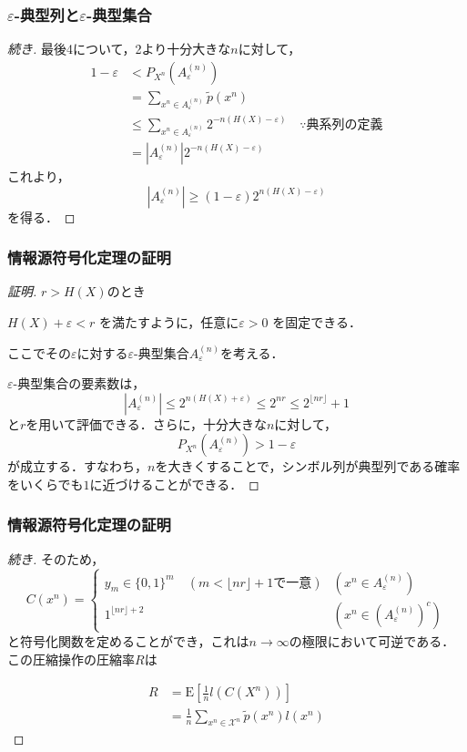 \documentclass{classes/myslide}
\begin{document}
\begin{frame}\frametitle{$\varepsilon$-典型列と$\varepsilon$-典型集合}
  \begin{proof}[続き]
    最後4について，2より十分大きな$n$に対して，
    \begin{align*}
      1 - \varepsilon 
      &< P_{X^n}(A_{\varepsilon}^{(n)}) \\
      &= \sum_{x^n \in A_{\varepsilon}^{(n)}} \tilde{p}(x^n) \\
      &\leq \sum_{x^n \in A_{\varepsilon}^{(n)}} 2^{-n(H(X) - \varepsilon)} \quad \because \text{典系列の定義} \\
      &= |A_{\varepsilon}^{(n)}| 2^{-n(H(X) - \varepsilon)}
    \end{align*}
    これより，
    \[
      |A_{\varepsilon}^{(n)}| \geq (1 - \varepsilon)2^{n(H(X) - \varepsilon)}
    \]
    を得る．
  \end{proof}
\end{frame}


\begin{frame}\frametitle{情報源符号化定理の証明}
  \begin{proof}[証明]
    $r > H(X)$のとき

    $H(X) + \varepsilon < r$ を満たすように，任意に$\varepsilon > 0$ を固定できる．

    ここでその$\varepsilon$に対する$\varepsilon$-典型集合$A_{\varepsilon}^{(n)}$を考える．

    $\varepsilon$-典型集合の要素数は，
    \[ |A_{\varepsilon}^{(n)}| \leq 2^{n(H(X) + \varepsilon)}  \leq 2^{nr} \leq 2^{\lfloor nr \rfloor} + 1\]
    と$r$を用いて評価できる．さらに，十分大きな$n$に対して，
    \[ P_{X^n}(A_{\varepsilon}^{(n)}) > 1 - \varepsilon \]
    が成立する．すなわち，$n$を大きくすることで，シンボル列が典型列である確率をいくらでも$1$に近づけることができる．
    \let\qedsymbol\relax
  \end{proof}
\end{frame}

\begin{frame}\frametitle{情報源符号化定理の証明}
  \begin{proof}[続き]
    そのため，
    \[ 
      C(x^n) = 
        \begin{cases}
          y_m \in \{0, 1\}^m \quad (m <\lfloor nr \rfloor + 1 \textbf{で一意}) &  (x^n \in A_{\varepsilon}^{(n)})\\
          1^{\lfloor nr \rfloor + 2} & (x^n \in (A_{\varepsilon}^{(n)})^c)
        \end{cases}
    \]
    と符号化関数を定めることができ，これは$n \to \infty$の極限において可逆である．
    この圧縮操作の圧縮率$R$は

    \begin{align*}
      R 
      &= \mathrm{E}\left \lbrack \frac{1}{n} l(C(X^n)) \right \rbrack  \\
      &= \frac{1}{n} \sum_{x^n \in \mathcal{X}^n} \tilde{p}(x^n)l(x^n) 
    \end{align*}
    \let\qedsymbol\relax
  \end{proof}
\end{frame}
\end{document}
